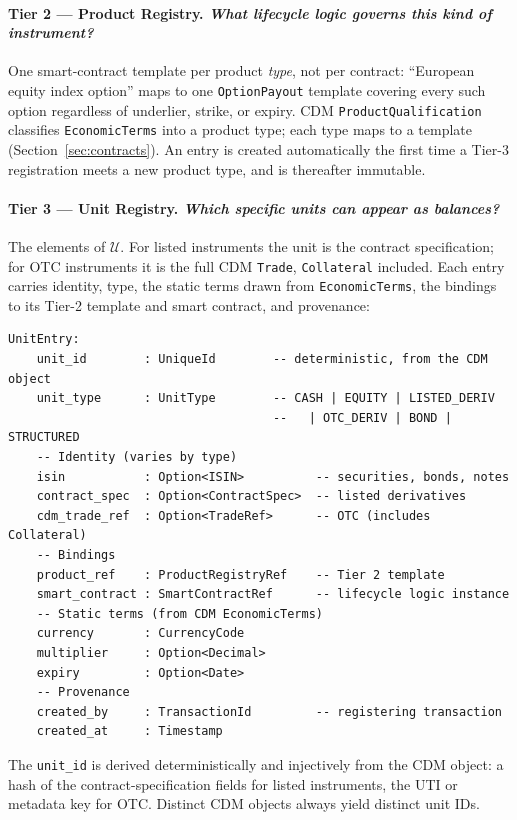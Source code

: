 \paragraph{Tier 2 --- Product Registry. \emph{What lifecycle logic governs this kind of instrument?}}
One smart-contract template per product \emph{type}, not per contract: ``European equity index option'' maps to one \texttt{OptionPayout} template covering every such option regardless of underlier, strike, or expiry. CDM \texttt{ProductQualification} classifies \texttt{EconomicTerms} into a product type; each type maps to a template (Section~\ref{sec:contracts}). An entry is created automatically the first time a Tier-3 registration meets a new product type, and is thereafter immutable.

\paragraph{Tier 3 --- Unit Registry. \emph{Which specific units can appear as balances?}}
The elements of $\mathcal{U}$. For listed instruments the unit is the contract specification; for OTC instruments it is the full CDM \texttt{Trade}, \texttt{Collateral} included. Each entry carries identity, type, the static terms drawn from \texttt{EconomicTerms}, the bindings to its Tier-2 template and smart contract, and provenance:

\begin{lstlisting}
UnitEntry:
    unit_id        : UniqueId        -- deterministic, from the CDM object
    unit_type      : UnitType        -- CASH | EQUITY | LISTED_DERIV
                                     --   | OTC_DERIV | BOND | STRUCTURED
    -- Identity (varies by type)
    isin           : Option<ISIN>          -- securities, bonds, notes
    contract_spec  : Option<ContractSpec>  -- listed derivatives
    cdm_trade_ref  : Option<TradeRef>      -- OTC (includes Collateral)
    -- Bindings
    product_ref    : ProductRegistryRef    -- Tier 2 template
    smart_contract : SmartContractRef      -- lifecycle logic instance
    -- Static terms (from CDM EconomicTerms)
    currency       : CurrencyCode
    multiplier     : Option<Decimal>
    expiry         : Option<Date>
    -- Provenance
    created_by     : TransactionId         -- registering transaction
    created_at     : Timestamp
\end{lstlisting}

The \texttt{unit\_id} is derived deterministically and injectively from the CDM object: a hash of the contract-specification fields for listed instruments, the UTI or metadata key for OTC. Distinct CDM objects always yield distinct unit IDs.

